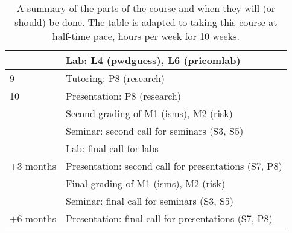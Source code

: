 \begin{table}
\begin{tabular}{lp{9cm}}
    & Lab: L4 (pwdguess), L6 (pricomlab)\\
    \midrule
    9
    & Tutoring: P8 (research)\\
    \midrule
    10
    & Presentation: P8 (research)\\
    & Second grading of M1 (isms), M2 (risk)\\
    & Seminar: second call for seminars (S3, S5)\\
    & Lab: final call for labs\\
    \midrule
    +3 months
    & Presentation: second call for presentations (S7, P8)\\
    & Final grading of M1 (isms), M2 (risk)\\
    & Seminar: final call for seminars (S3, S5)\\
    \midrule
    +6 months
    & Presentation: final call for presentations (S7, P8)\\
    \bottomrule
  \end{tabular}
  \caption{%
    A summary of the parts of the course and when they will (or should) be done.
    The table is adapted to taking this course at half-time pace,  hours 
    per week for 10 weeks.
  }\label{Schedule}
\end{table}

